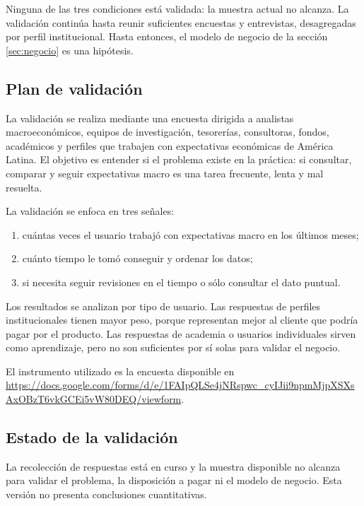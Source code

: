 \documentclass[11pt,a4paper]{article}
\begin{document}
Ninguna de las tres condiciones est\'a validada: la muestra actual no alcanza.
La validaci\'on contin\'ua hasta reunir suficientes encuestas y entrevistas,
desagregadas por perfil institucional. Hasta entonces, el modelo de negocio de
la secci\'on \ref{sec:negocio} es una hip\'otesis.

\subsection{Plan de validaci\'on}

La validaci\'on se realiza mediante una encuesta dirigida a analistas
macroecon\'omicos, equipos de investigaci\'on, tesorer\'ias, consultoras,
fondos, acad\'emicos y perfiles que trabajen con expectativas econ\'omicas de
Am\'erica Latina. El objetivo es entender si el problema existe en la
pr\'actica: si consultar, comparar y seguir expectativas macro es una tarea
frecuente, lenta y mal resuelta.

La validaci\'on se enfoca en tres se\~nales:

\begin{enumerate}
  \item cu\'antas veces el usuario trabaj\'o con expectativas macro en los
        \'ultimos meses;
  \item cu\'anto tiempo le tom\'o conseguir y ordenar los datos;
  \item si necesita seguir revisiones en el tiempo o s\'olo consultar el dato
        puntual.
\end{enumerate}

Los resultados se analizan por tipo de usuario. Las respuestas de perfiles
institucionales tienen mayor peso, porque representan mejor al cliente que
podr\'ia pagar por el producto. Las respuestas de academia o usuarios
individuales sirven como aprendizaje, pero no son suficientes por s\'i solas
para validar el negocio.

El instrumento utilizado es la encuesta disponible en
\url{https://docs.google.com/forms/d/e/1FAIpQLSe4jNRspwc_cyIJii9npmMjpXSXsAxOBzT6vkGCEi5vW80DEQ/viewform}.

\subsection{Estado de la validaci\'on}

La recolecci\'on de respuestas est\'a en curso y la muestra disponible no
alcanza para validar el problema, la disposici\'on a pagar ni el modelo de
negocio. Esta versi\'on no presenta conclusiones cuantitativas.
\end{document}
